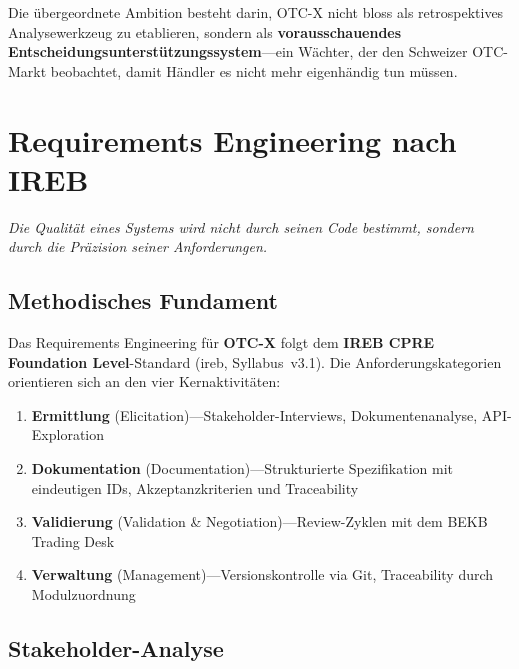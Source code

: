 \documentclass[11pt, a4paper, oneside, openany]{report}
\newcommand{\term}[1]{\textcolor{SwissRed}{\textsf{\textbf{#1}}}}
\begin{document}
\begin{insightbox}
Die übergeordnete Ambition besteht darin, OTC-X nicht bloss als retrospektives Analysewerkzeug zu etablieren, sondern als \textbf{vorausschauendes Entscheidungsunterstützungssystem}\;---\;ein Wächter, der den Schweizer OTC-Markt beobachtet, damit Händler es nicht mehr eigenhändig tun müssen.
\end{insightbox}


\chapter{Requirements Engineering nach IREB}
\label{ch:requirements}

\epigraph{\itshape Die Qualität eines Systems wird nicht durch seinen Code bestimmt, sondern durch die Präzision seiner Anforderungen.}{}

\section{Methodisches Fundament}

Das Requirements Engineering für \term{OTC-X} folgt dem \textbf{IREB CPRE Foundation Level}-Standard (\gls{ireb}, Syllabus~v3.1). Die Anforderungskategorien orientieren sich an den vier Kernaktivitäten:

\begin{enumerate}[label=\textcolor{SwissRed}{\textbf{\arabic*.}}]
  \item \textbf{Ermittlung} (Elicitation)\;---\;Stakeholder-Interviews, Dokumentenanalyse, API-Exploration
  \item \textbf{Dokumentation} (Documentation)\;---\;Strukturierte Spezifikation mit eindeutigen IDs, Akzeptanzkriterien und Traceability
  \item \textbf{Validierung} (Validation \& Negotiation)\;---\;Review-Zyklen mit dem BEKB Trading Desk
  \item \textbf{Verwaltung} (Management)\;---\;Versionskontrolle via Git, Traceability durch Modulzuordnung
\end{enumerate}

\section{Stakeholder-Analyse}
\end{document}
